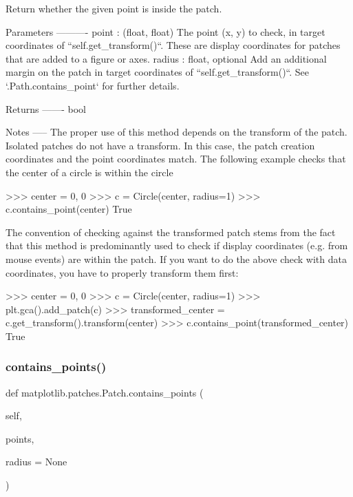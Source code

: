 \begin{DoxyVerb}Return whether the given point is inside the patch.

Parameters
----------
point : (float, float)
    The point (x, y) to check, in target coordinates of
    ``self.get_transform()``. These are display coordinates for patches
    that are added to a figure or axes.
radius : float, optional
    Add an additional margin on the patch in target coordinates of
    ``self.get_transform()``. See `.Path.contains_point` for further
    details.

Returns
-------
bool

Notes
-----
The proper use of this method depends on the transform of the patch.
Isolated patches do not have a transform. In this case, the patch
creation coordinates and the point coordinates match. The following
example checks that the center of a circle is within the circle

>>> center = 0, 0
>>> c = Circle(center, radius=1)
>>> c.contains_point(center)
True

The convention of checking against the transformed patch stems from
the fact that this method is predominantly used to check if display
coordinates (e.g. from mouse events) are within the patch. If you want
to do the above check with data coordinates, you have to properly
transform them first:

>>> center = 0, 0
>>> c = Circle(center, radius=1)
>>> plt.gca().add_patch(c)
>>> transformed_center = c.get_transform().transform(center)
>>> c.contains_point(transformed_center)
True\end{DoxyVerb}
 \mbox{\label{classmatplotlib_1_1patches_1_1Patch_ac15e677836abd69dd498b4ac202f923b}} 
\subsubsection{\texorpdfstring{contains\+\_\+points()}{contains\_points()}}
{\footnotesize\ttfamily def matplotlib.\+patches.\+Patch.\+contains\+\_\+points (\begin{DoxyParamCaption}\item[{}]{self,  }\item[{}]{points,  }\item[{}]{radius = {\ttfamily None} }\end{DoxyParamCaption})}

